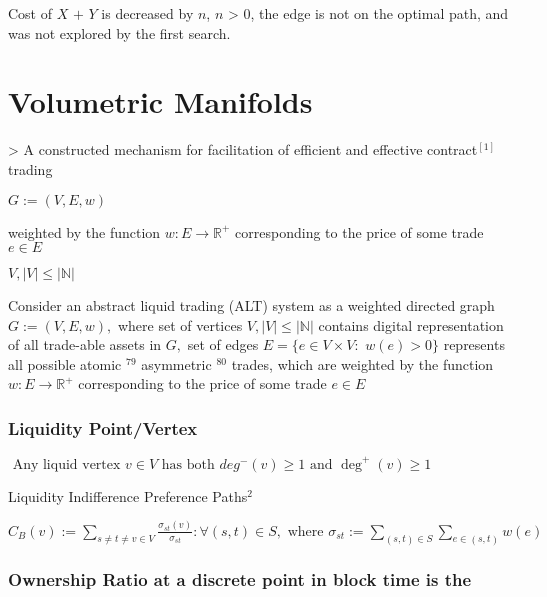 {	Cost of $X$ $+$ $Y$ is decreased by $n$, $n$ > $0$, the edge is not on the optimal path, and was not explored by
	the first search.
	
	
	
	\newpage
	
	\chapter{Volumetric Manifolds}
	
	> A constructed mechanism for facilitation of efficient and effective contract$^[1]$ trading 
	
	$
	G:=(V, E, w)
	$
	
	
	
	weighted by the function $w: E \rightarrow \mathbb{R}^{+}$ corresponding to the price of some trade $e \in E$
	
	
	$ V,|V| \leq|\mathbb{N}| $
	
	
	
	Consider an abstract liquid trading (ALT) system as a weighted directed graph $G:=(V, E, w),$ where set of vertices $V,|V| \leq|\mathbb{N}|$ contains digital representation of all trade-able assets in $G,$ set of edges $E=\{e \in V \times V:$ $w(e)>0\}$ represents all possible atomic $^{79}$ asymmetric $^{80}$ trades, which are weighted by the function $w: E \rightarrow \mathbb{R}^{+}$ corresponding to the price of some trade $e \in E$
	
	
	\subsection{Liquidity Point/Vertex}
	
	$
	\text { Any liquid vertex } v \in V \text{ has both } d e g^{-}(v) \geq 1 \text{ and } \operatorname{deg}^{+}(v) \geq 1
	$
	
	
	Liquidity Indifference Preference Paths$^{2}$
	
	$C_{B}(v):=\sum_{s \neq t \neq v \in V} \frac{\sigma_{s t}(v)}{\sigma_{s t}}: \forall(s, t) \in S, \text{ where } \sigma_{s t}:=\sum_{(s, t) \in S} \sum_{e \in(s, t)} w(e)$
	
	
	\subsection{Ownership Ratio at a discrete point in block time
		is the \label{Ownership Ratio at a discrete point in block time and
			\begin{equation}
				\theta=\frac{B_{t}(h)}{S_{t}}
			\end{equation}
			
}}}
